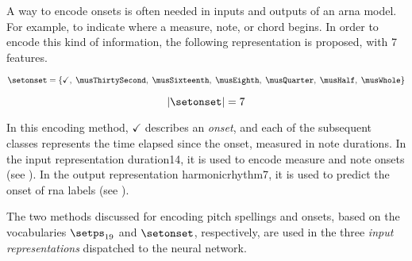 
A way to encode onsets is often needed in inputs and outputs
of an \gls{arna} model. For example, to indicate where a
measure, note, or chord begins. 
In order to encode this kind of information, the following
representation is proposed, with 7 features.

\begin{equation}
    \label{eq:onset_7}
    \setonset = \{\checkmark,\; \musThirtySecond,\; \musSixteenth,\; 
    \musEighth,\; \musQuarter,\; \musHalf,\; \musWhole \}
\end{equation}

\begin{equation}
    \label{eq:onset_7_magnitude}
    | \setonset | = 7
\end{equation}

In this encoding method, $\checkmark$ describes an
\emph{onset}, and each of the subsequent classes represents
the time elapsed since the onset, measured in note
durations. In the input representation \gls{duration14}, it
is used to encode measure and note onsets (see
). In the output
representation \gls{harmonicrhythm7}, it is used to predict
the onset of \gls{rna} labels (see
).

The two methods discussed for encoding pitch spellings and
onsets, based on the vocabularies $\setps_{19}$ and
$\setonset$, respectively, are used in the three \emph{input
representations} dispatched to the neural network.
